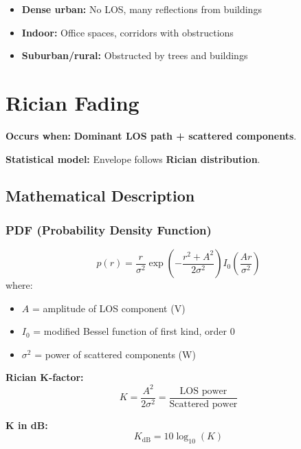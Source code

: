 \begin{itemize}
\item \textbf{Dense urban:} No LOS, many reflections from buildings
\item \textbf{Indoor:} Office spaces, corridors with obstructions
\item \textbf{Suburban/rural:} Obstructed by trees and buildings
\end{itemize}

\section{Rician Fading}

\textbf{Occurs when:} \textbf{Dominant LOS path + scattered components}.

\textbf{Statistical model:} Envelope follows \textbf{Rician distribution}.

\subsection{Mathematical Description}

\subsubsection{PDF (Probability Density Function)}

\begin{equation}
p(r) = \frac{r}{\sigma^2} \exp\left(-\frac{r^2 + A^2}{2\sigma^2}\right) I_0\left(\frac{Ar}{\sigma^2}\right)
\label{eq:rician-pdf}
\end{equation}
where:
\begin{itemize}
\item $A$ = amplitude of LOS component (V)
\item $I_0$ = modified Bessel function of first kind, order 0
\item $\sigma^2$ = power of scattered components (W)
\end{itemize}

\textbf{Rician K-factor:}
\begin{equation}
K = \frac{A^2}{2\sigma^2} = \frac{\text{LOS power}}{\text{Scattered power}}
\label{eq:rician-k-factor}
\end{equation}

\textbf{K in dB:}
\begin{equation}
K_{\text{dB}} = 10\log_{10}(K)
\label{eq:k-factor-db}
\end{equation}

